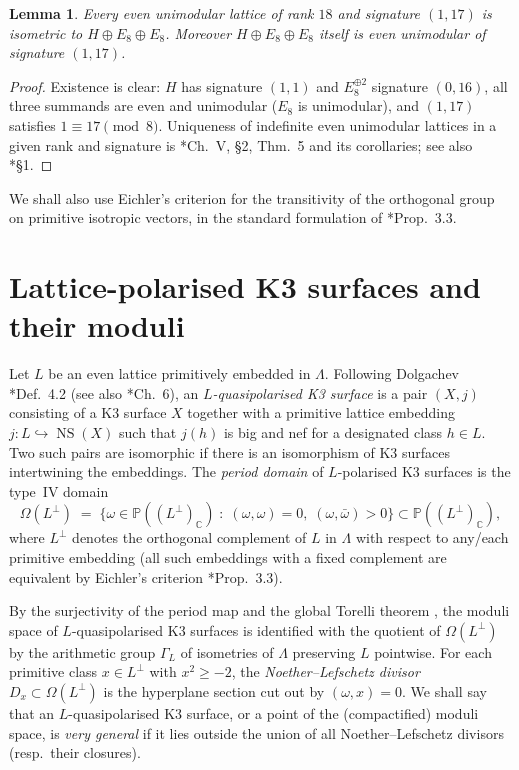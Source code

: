 \documentclass[11pt]{amsart}
\theoremstyle{plain}
\newtheorem{lemma}[theorem]{Lemma}
\theoremstyle{definition}
\newcommand{\C}{\mathbb{C}}
\newcommand{\NS}{\operatorname{NS}}
\newcommand{\Lam}{\Lambda}
\begin{document}
\begin{lemma}\label{lem:evenunimodular}
Every even unimodular lattice of rank $18$ and signature $(1,17)$ is isometric
to $H\oplus E_8\oplus E_8$. Moreover $H\oplus E_8\oplus E_8$ itself is even
unimodular of signature $(1,17)$.
\end{lemma}

\begin{proof}
Existence is clear: $H$ has signature $(1,1)$ and $E_8^{\oplus 2}$ signature
$(0,16)$, all three summands are even and unimodular ($E_8$ is unimodular),
and $(1,17)$ satisfies $1\equiv 17\pmod 8$. Uniqueness of indefinite even
unimodular lattices in a given rank and signature is
\cite{Ser70}*{Ch.~V, \S2, Thm.~5 and its corollaries}; see also
\cite{Nik80}*{\S1}.
\end{proof}

We shall also use Eichler's criterion for the transitivity of the orthogonal
group on primitive isotropic vectors, in the standard formulation of
\cite{GHS07}*{Prop.~3.3}.

\section{Lattice-polarised K3 surfaces and their moduli}

Let $L$ be an even lattice primitively embedded in $\Lam$. Following Dolgachev
\cite{Dol96}*{Def.~4.2} (see also \cite{Huy16}*{Ch.~6}), an
\emph{$L$-quasipolarised K3 surface} is a pair $(X,j)$ consisting of a K3
surface $X$ together with a primitive lattice embedding
$j\colon L\hookrightarrow \NS(X)$ such that $j(h)$ is big and nef for a
designated class $h\in L$. Two such pairs are isomorphic if there is an
isomorphism of K3 surfaces intertwining the embeddings. The \emph{period domain}
of $L$-polarised K3 surfaces is the type~IV domain
\[
\Omega(L^\perp)\;=\;\bigl\{\omega\in \mathbb{P}((L^\perp)_\C)\;:\;
(\omega,\omega)=0,\;(\omega,\bar\omega)>0\bigr\}\subset \mathbb{P}((L^\perp)_\C),
\]
where $L^\perp$ denotes the orthogonal complement of $L$ in $\Lam$ with respect
to any/each primitive embedding (all such embeddings with a fixed complement
are equivalent by Eichler's criterion \cite{GHS07}*{Prop.~3.3}).

By the surjectivity of the period map and the global Torelli theorem
\cite{PS71,SD74}, the moduli space of $L$-quasipolarised K3 surfaces is
identified with the quotient of $\Omega(L^\perp)$ by the arithmetic group
$\Gamma_L$ of isometries of $\Lam$ preserving $L$ pointwise. For each primitive
class $x\in L^\perp$ with $x^2\geq -2$, the \emph{Noether--Lefschetz divisor}
$D_x\subset \Omega(L^\perp)$ is the hyperplane section cut out by
$(\omega,x)=0$. We shall say that an $L$-quasipolarised K3 surface, or a point
of the (compactified) moduli space, is \emph{very general} if it lies outside
the union of all Noether--Lefschetz divisors (resp.\ their closures).
\end{document}
